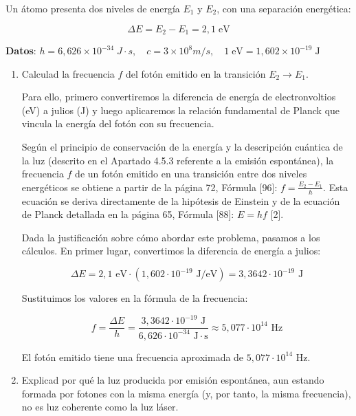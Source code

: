 \documentclass[11pt, a4paper]{article}
\newenvironment{problem}[1][Cuestión]{
	\vspace{0.5cm}
	\noindent{\Large\bfseries #1} \par\vspace{0.5cm}
}{
	\vspace{0.5cm}
}
\begin{document}
	\begin{problem}[Cuestión 6]
		Un átomo presenta dos niveles de energía $E_1$ y $E_2$, con una separación energética:

		\begin{equation}
			\Delta E=E_2 - E_1 = 2,1 \; \text{eV}
		\end{equation}

		\vspace{0.25cm}

		\textbf{Datos}: $h=6,626 \times 10^{-34} \; J \cdot s, \quad c= 3 \times 10^8 m/s, \quad 1 \; \text{eV} = 1,602 \times 10^{-19} \; \text{J}$

		\begin{enumerate}[label=\alph*)]
			\item Calculad la frecuencia $f$ del fotón emitido en la transición $E_2 \to E_1$.

				{ \color{blue} 
					Para ello, primero convertiremos la diferencia de energía de electronvoltios (eV) a julios (J) y luego aplicaremos la relación fundamental de Planck que vincula la energía del fotón con su frecuencia.

					Según el principio de conservación de la energía y la descripción cuántica de la luz (descrito en el Apartado 4.5.3 referente a la emisión espontánea), la frecuencia $f$ de un fotón emitido en una transición entre dos niveles energéticos se obtiene a partir de la página 72, Fórmula [96]: $f = \frac{E_2 - E_1}{h}$. Esta ecuación se deriva directamente de la hipótesis de Einstein y de la ecuación de Planck detallada en la página 65, Fórmula [88]: $E = hf$ [2].

					Dada la justificación sobre cómo abordar este problema, pasamos a los cálculos. En primer lugar, convertimos la diferencia de energía a julios:

					$$
					\Delta E = 2,1 \text{ eV} \cdot \left( 1,602 \cdot 10^{-19} \text{ J/eV} \right) = 3,3642 \cdot 10^{-19} \text{ J}
					$$

					Sustituimos los valores en la fórmula de la frecuencia:

					$$
					f = \frac{\Delta E}{h} = \frac{3,3642 \cdot 10^{-19} \text{ J}}{6,626 \cdot 10^{-34} \text{ J}\cdot\text{s}} \approx 5,077 \cdot 10^{14} \text{ Hz}
					$$

					El fotón emitido tiene una frecuencia aproximada de $5,077 \cdot 10^{14} \text{ Hz}$.
				}

			\item Explicad por qué la luz producida por emisión espontánea, aun estando formada por fotones con la misma energía (y, por tanto, la misma frecuencia), no es luz coherente como la luz láser.


\end{enumerate}
\end{problem}
\end{document}
